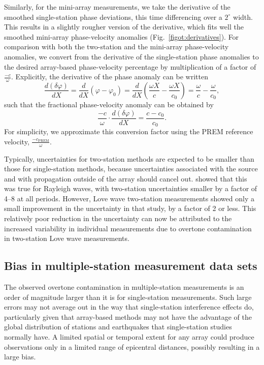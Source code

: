 \documentclass[12pt,oneside]{book}
\newcommand{\degree}[1]{\mbox{$#1^{\circ}$}}
\begin{document}
Similarly, for the mini-array measurements, we take the derivative of the smoothed single-station phase deviations, this time differencing over a \degree{2} width. This results in a slightly rougher version of the derivative, which fits well the smoothed mini-array phase-velocity anomalies (Fig.~\ref{figot:derivatives}). For comparison with both the two-station and the mini-array phase-velocity anomalies, we convert from the derivative of the single-station phase anomalies to the desired array-based phase-velocity percentage by multiplication of a factor of $\frac{-c}{\omega}$. Explicitly, the derivative of the phase anomaly can be written
\begin{equation}
\frac{d(\delta\varphi)}{dX} = \frac{d}{dX} \left( \varphi - \varphi_0 \right)  = \frac{d}{dX} \left( \frac{\omega X}{c} - \frac{\omega X}{c_0} \right) = \frac{\omega}{c} - \frac{\omega}{c_0},
\end{equation}
such that the fractional phase-velocity anomaly can be obtained by
\begin{equation}
\frac{-c}{\omega} \cdot \frac{d(\delta\varphi)}{dX} = \frac{c -c_0}{c_0}.
\end{equation}
For simplicity, we approximate this conversion factor using the PREM reference velocity, $\frac{-c_{\mathrm{PREM}}}{\omega}$.

Typically, uncertainties for two-station methods are expected to be smaller than those for single-station methods, because uncertainties associated with the source and with propagation outside of the array should cancel out. \citet{Fosteretal2014} showed that this was true for Rayleigh waves, with two-station uncertainties smaller by a factor of 4--8 at all periods. However, Love wave two-station measurements showed only a small improvement in the uncertainty in that study, by a factor of 2 or less. This relatively poor reduction in the uncertainty can now be attributed to the increased variability in individual measurements due to overtone contamination in two-station Love wave measurements. 

\subsection{Bias in multiple-station measurement data sets}
The observed overtone contamination in multiple-station measurements is an order of magnitude larger than it is for single-station measurements. Such large errors may not average out in the way that single-station interference effects do, particularly given that array-based methods may not have the advantage of the global distribution of stations and earthquakes that single-station studies normally have. A limited spatial or temporal extent for any array could produce observations only in a limited range of epicentral distances, possibly resulting in a large bias. 
\end{document}
